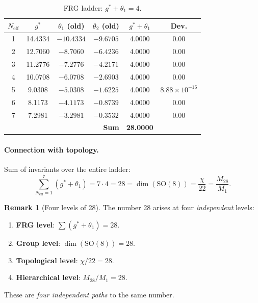 \documentclass[11pt,a4paper]{article}
\newcommand{\SO}{\mathrm{SO}}
\theoremstyle{definition}
\newtheorem{remark}[theorem]{Remark}
\begin{document}
\begin{table}[htbp]
\centering
\caption{FRG ladder: $g^* + \theta_1 = 4$.}
\label{tab:frg-ladder-review}
\begin{tabular}{cccccc}
\toprule
$N_{\text{eff}}$ & $g^*$ & $\theta_1$ (old) & $\theta_2$ (old) 
& $g^* + \theta_1$ & Dev. \\
\midrule
1 & 14.4334 & $-10.4334$ & $-9.6705$ & 4.0000 & $0.00$ \\
2 & 12.7060 & $-8.7060$  & $-6.4236$ & 4.0000 & $0.00$ \\
3 & 11.2776 & $-7.2776$  & $-4.2171$ & 4.0000 & $0.00$ \\
4 & 10.0708 & $-6.0708$  & $-2.6903$ & 4.0000 & $0.00$ \\
5 & 9.0308  & $-5.0308$  & $-1.6225$ & 4.0000 & $8.88 \times 10^{-16}$ \\
6 & 8.1173  & $-4.1173$  & $-0.8739$ & 4.0000 & $0.00$ \\
7 & 7.2981  & $-3.2981$  & $-0.3532$ & 4.0000 & $0.00$ \\
\midrule
\multicolumn{4}{r}{\textbf{Sum}} & \textbf{28.0000} & \\
\bottomrule
\end{tabular}
\end{table}

\paragraph{Connection with topology.}
Sum of invariants over the entire ladder:
\begin{equation}
    \boxed{
    \sum_{N_{\text{eff}}=1}^{7} (g^* + \theta_1) = 7 \cdot 4 = 28
    = \dim(\SO(8)) = \frac{\chi}{22} = \frac{M_{28}}{M_1}.
    }
    \label{eq:frg-sum-28-review}
\end{equation}

\begin{remark}[Four levels of 28]
\label{rem:four-28-review}
The number 28 arises at four \emph{independent} levels:
\begin{enumerate}
    \item \textbf{FRG level}: $\sum(g^* + \theta_1) = 28$.
    \item \textbf{Group level}: $\dim(\SO(8)) = 28$.
    \item \textbf{Topological level}: $\chi/22 = 28$.
    \item \textbf{Hierarchical level}: $M_{28}/M_1 = 28$.
\end{enumerate}
These are \emph{four independent paths} to the same number.
\end{remark}
\end{document}
